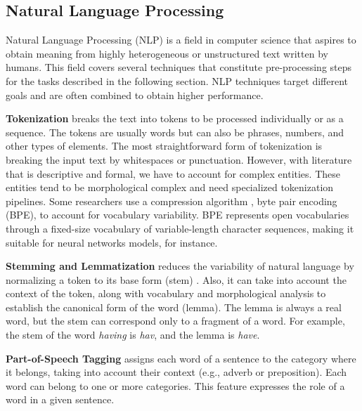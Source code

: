\hypertarget{2.1.1}{\subsection{Natural Language Processing}}

Natural Language Processing (NLP) is a field in computer science that aspires to obtain meaning from highly heterogeneous or unstructured text written by humans. This field covers several techniques that constitute pre-processing steps for the tasks described in the following section. NLP techniques target different goals and are often combined to obtain higher performance. 

\textbf{Tokenization} breaks the text into tokens to be processed individually or as a sequence. The tokens are usually words but can also be phrases, numbers, and other types of elements. 
The most straightforward form of tokenization is breaking the input text by whitespaces or punctuation. However, with literature that is descriptive and formal, we have to account for complex entities. These entities tend to be morphological complex and need specialized tokenization pipelines. Some researchers use a compression algorithm \citep{sennrich2015neural}, byte pair encoding (BPE), to account for vocabulary variability. BPE represents open vocabularies through a fixed-size vocabulary of variable-length character sequences, making it suitable for neural networks models, for instance.

\textbf{Stemming and Lemmatization} reduces the variability of natural language by normalizing a token to its base form (stem) \citep{manning2008introduction}. Also, it can take into account the context of the token, along with vocabulary and morphological analysis to establish the canonical form of the word (lemma). The lemma is always a real word, but the stem can correspond only to a fragment of a word. For example, the stem of the word \textit{having} is \textit{hav}, and the lemma is \textit{have}.
    
\textbf{Part-of-Speech Tagging} assigns each word of a sentence to the category where it belongs, taking into account their context (e.g., adverb or preposition). Each word can belong to one or more categories. This feature expresses the role of a word in a given sentence. 
    
